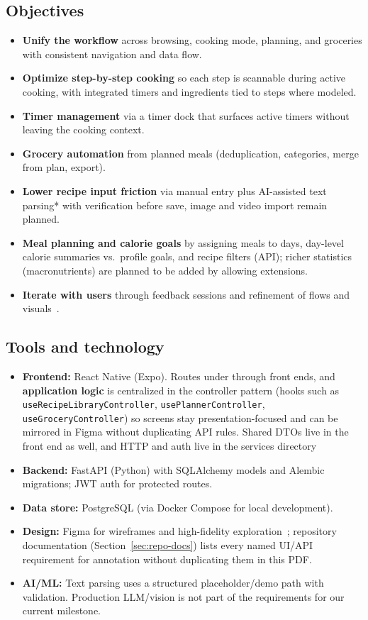 \documentclass[conference]{IEEEtran}
\begin{document}
\subsection{Objectives}
\begin{itemize}[leftmargin=*]
  \item \textbf{Unify the workflow} across browsing, cooking mode, planning, and groceries with consistent navigation and data flow.
  \item \textbf{Optimize step-by-step cooking} so each step is scannable during active cooking, with integrated timers and ingredients tied to steps where modeled.
  \item \textbf{Timer management} via a timer dock that surfaces active timers without leaving the cooking context.
  \item \textbf{Grocery automation} from planned meals (deduplication, categories, merge from plan, export).
  \item \textbf{Lower recipe input friction} via manual entry plus AI-assisted text parsing* with verification before save, image and video import remain planned.
  \item \textbf{Meal planning and calorie goals} by assigning meals to days, day-level calorie summaries vs.\ profile goals, and recipe filters (API); richer statistics (macronutrients) are planned to be added by allowing extensions.
  \item \textbf{Iterate with users} through feedback sessions and refinement of flows and visuals~\cite{nielsen1994heuristic}.
\end{itemize}

\subsection{Tools and technology}
\begin{itemize}[leftmargin=*]
  \item \textbf{Frontend:} React Native (Expo). Routes under through front ends, and \textbf{application logic} is centralized in the controller pattern (hooks such as \texttt{useRecipeLibraryController}, \texttt{usePlannerController}, \texttt{useGroceryController}) so screens stay presentation-focused and can be mirrored in Figma without duplicating API rules. Shared DTOs live in the front end as well, and HTTP and auth live in the services directory
  \item \textbf{Backend:} FastAPI (Python) with SQLAlchemy models and Alembic migrations; JWT auth for protected routes.
  \item \textbf{Data store:} PostgreSQL (via Docker Compose for local development).
  \item \textbf{Design:} Figma for wireframes and high-fidelity exploration~\cite{figma2026help}; repository documentation (Section~\ref{sec:repo-docs}) lists every named UI/API requirement for annotation without duplicating them in this PDF.
  \item \textbf{AI/ML:} Text parsing uses a structured placeholder/demo path with validation. Production LLM/vision is not part of the requirements for our current milestone.
\end{itemize}
\end{document}
